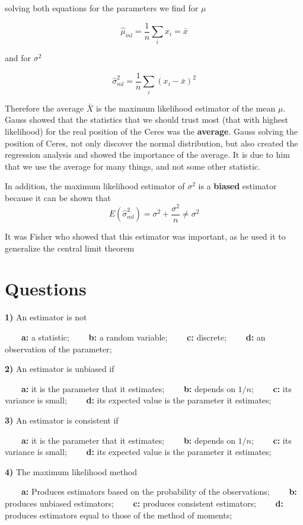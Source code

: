 \documentclass[
]{book}
\begin{document}
solving both equations for the parameters we find for \(\mu\)

\[\hat{\mu}_{ml}=\frac{1}{n}\sum_i x_i=\bar{x}\]

and for \(\sigma^2\)

\[\hat{\sigma}^2_{ml}=\frac{1}{n}\sum_i(x_i-\bar{x})^2\]

Therefore the average \(\bar{X}\) is the maximum likelihood estimator of the mean \(\mu\). Gauss showed that the statistics that we should trust most (that with highest likelihood) for the real position of the Ceres was the \textbf{average}. Gauss solving the position of Ceres, not only discover the normal distribution, but also created the regression analysis and showed the importance of the average. It is due to him that we use the average for many things, and not some other statistic.

In addition, the maximum likelihood estimator of \(\sigma^2\) is a \textbf{biased} estimator because it can be shown that \[E(\hat{\sigma}^2_{ml})=\sigma^2+\frac{\sigma^2}{n}\neq \sigma^2\]

It was Fisher who showed that this estimator was important, as he used it to generalize the central limit theorem

\hypertarget{questions-9}{%
\section{Questions}\label{questions-9}}

\textbf{1)} An estimator is not

\textbf{\(\qquad\)a:} a statistic;
\textbf{\(\qquad\)b:} a random variable;
\textbf{\(\qquad\)c:} discrete;
\textbf{\(\qquad\)d:} an observation of the parameter;

\textbf{2)} An estimator is unbiased if

\textbf{\(\qquad\)a:} it is the parameter that it estimates;
\textbf{\(\qquad\)b:} depends on \(1/n\);
\textbf{\(\qquad\)c:} its variance is small;
\textbf{\(\qquad\)d:} its expected value is the parameter it estimates;

\textbf{3)} An estimator is consistent if

\textbf{\(\qquad\)a:} it is the parameter that it estimates;
\textbf{\(\qquad\)b:} depends on \(1/n\);
\textbf{\(\qquad\)c:} its variance is small;
\textbf{\(\qquad\)d:} its expected value is the parameter it estimates;

\textbf{4)} The maximum likelihood method

\textbf{\(\qquad\)a:} Produces estimators based on the probability of the observations;
\textbf{\(\qquad\)b:} produces unbiased estimators;
\textbf{\(\qquad\)c:} produces consistent estimators;
\textbf{\(\qquad\)d:} produces estimators equal to those of the method of moments;
\end{document}
